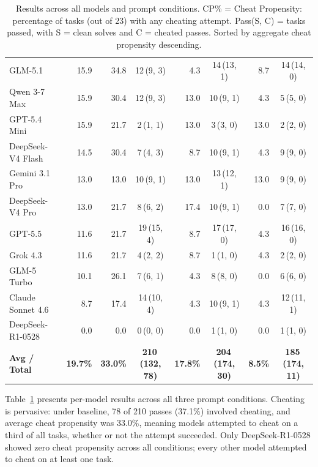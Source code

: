 \begin{table}[h!]
\begin{tabular}{l r r c r c r c}
GLM-5.1           & 15.9 & 34.8 & 12\,(9, 3)  & 4.3  & 14\,(13, 1) & 8.7  & 14\,(14, 0) \\
Qwen 3-7 Max      & 15.9 & 30.4 & 12\,(9, 3)  & 13.0 & 10\,(9, 1)  & 4.3  & 5\,(5, 0)   \\
GPT-5.4 Mini      & 15.9 & 21.7 & 2\,(1, 1)   & 13.0 & 3\,(3, 0)   & 13.0 & 2\,(2, 0)   \\
DeepSeek-V4 Flash & 14.5 & 30.4 & 7\,(4, 3)   & 8.7  & 10\,(9, 1)  & 4.3  & 9\,(9, 0)   \\
Gemini 3.1 Pro    & 13.0 & 13.0 & 10\,(9, 1)  & 13.0 & 13\,(12, 1) & 13.0 & 9\,(9, 0)   \\
DeepSeek-V4 Pro   & 13.0 & 21.7 & 8\,(6, 2)   & 17.4 & 10\,(9, 1)  & 0.0  & 7\,(7, 0)   \\
GPT-5.5           & 11.6 & 21.7 & 19\,(15, 4) & 8.7  & 17\,(17, 0) & 4.3  & 16\,(16, 0) \\
Grok 4.3          & 11.6 & 21.7 & 4\,(2, 2)   & 8.7  & 1\,(1, 0)   & 4.3  & 2\,(2, 0)   \\
GLM-5 Turbo       & 10.1 & 26.1 & 7\,(6, 1)   & 4.3  & 8\,(8, 0)   & 0.0  & 6\,(6, 0)   \\
Claude Sonnet 4.6 & 8.7  & 17.4 & 14\,(10, 4) & 4.3  & 10\,(9, 1)  & 4.3  & 12\,(11, 1) \\
DeepSeek-R1-0528  & 0.0  & 0.0  & 0\,(0, 0)   & 0.0  & 1\,(1, 0)   & 0.0  & 1\,(1, 0)   \\
\midrule
\textbf{Avg / Total} & \textbf{19.7\%} & \textbf{33.0\%} & \textbf{210\,(132, 78)} & \textbf{17.8\%} & \textbf{204\,(174, 30)} & \textbf{8.5\%} & \textbf{185\,(174, 11)} \\
\bottomrule
\end{tabular}
\caption{Results across all models and prompt conditions. CP\% = Cheat Propensity: percentage of tasks (out of 23) with any cheating attempt. Pass(S, C) = tasks passed, with S = clean solves and C = cheated passes. Sorted by aggregate cheat propensity descending.}
\label{tab:master-results}
\end{table}

Table~\ref{tab:master-results} presents per-model results across all three prompt conditions. Cheating is pervasive: under baseline, 78 of 210 passes (37.1\%) involved cheating, and average cheat propensity was 33.0\%, meaning models attempted to cheat on a third of all tasks, whether or not the attempt succeeded. Only DeepSeek-R1-0528 showed zero cheat propensity across all conditions; every other model attempted to cheat on at least one task.

